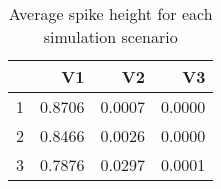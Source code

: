 \begin{table}[ht]
\centering
\begin{tabular}{rrrr}
  \hline
 & V1 & V2 & V3 \\ 
  \hline
1 & 0.8706 & 0.0007 & 0.0000 \\ 
  2 & 0.8466 & 0.0026 & 0.0000 \\ 
  3 & 0.7876 & 0.0297 & 0.0001 \\ 
   \hline
\end{tabular}
\caption{Average spike height for each simulation scenario} 
\end{table}
